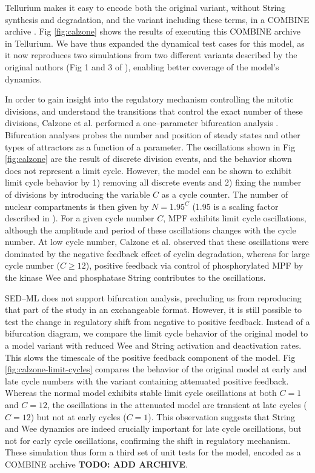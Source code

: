 \documentclass[10pt,letterpaper]{article}
\begin{document}
Tellurium makes it easy to encode both the original variant, without String synthesis and degradation, and the variant including these terms, in a COMBINE archive \cite{calzone-fig1-fig3}. Fig \ref{fig:calzone} shows the results of executing this COMBINE archive in Tellurium. We have thus expanded the dynamical test cases for this model, as it now reproduces two simulations from two different variants described by the original authors (Fig 1 and 3 of \cite{calzone2007dynamical}), enabling better coverage of the model's dynamics.

In order to gain insight into the regulatory mechanism controlling the mitotic divisions, and understand the transitions that control the exact number of these divisions, Calzone et al. performed a one--parameter bifurcation analysis \cite{calzone2007dynamical}. Bifurcation analyses probes the number and position of steady states and other types of attractors as a function of a parameter. The oscillations shown in Fig \ref{fig:calzone} are the result of discrete division events, and the behavior shown does not represent a limit cycle. However, the model can be shown to exhibit limit cycle behavior by 1) removing all discrete events and 2) fixing the number of divisions by introducing the variable $C$ as a cycle counter. The number of nuclear compartments is then given by $N = 1.95^C$ (1.95 is a scaling factor described in \cite{calzone2007dynamical}). For a given cycle number $C$, MPF exhibits limit cycle oscillations, although the amplitude and period of these oscillations changes with the cycle number. At low cycle number, Calzone et al. observed that these oscillations were dominated by the negative feedback effect of cyclin degradation, whereas for large cycle number ($C \ge 12$), positive feedback via control of phosphorylated MPF by the kinase Wee and phosphatase String contributes to the oscillations.

SED--ML does not support bifurcation analysis, precluding us from reproducing that part of the study in an exchangeable format. However, it is still possible to test the change in regulatory shift from negative to positive feedback. Instead of a bifurcation diagram, we compare the limit cycle behavior of the original model to a model variant with reduced Wee and String activation and deactivation rates. This slows the timescale of the positive feedback component of the model. Fig \ref{fig:calzone-limit-cycles} compares the behavior of the original model at early and late cycle numbers with the variant containing attenuated positive feedback. Whereas the normal model exhibits stable limit cycle oscillations at both $C=1$ and $C=12$, the oscillations in the attenuated model are transient at late cycles ($C=12$) but not at early cycles ($C=1$). This observation suggests that String and Wee dynamics are indeed crucially important for late cycle oscillations, but not for early cycle oscillations, confirming the shift in regulatory mechanism. These simulation thus form a third set of unit tests for the model, encoded as a COMBINE archive \textbf{TODO: ADD ARCHIVE}.
\end{document}
